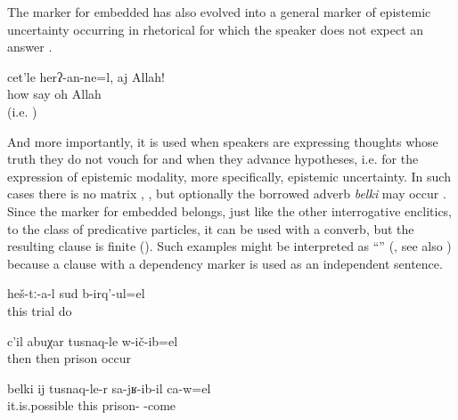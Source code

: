 The marker for embedded  has also evolved into a general marker of epistemic uncertainty occurring in rhetorical  for which the speaker does not expect an answer .

\begin{exe}
	\ex	\label{ex:How should this be said, oh, Allah!A}
	\gll	cet'le	herʔ-an-ne=l,	aj	Allah!\\
		how	say	oh	Allah\\
	\glt	{} (i.e. )
\end{exe}

And more importantly, it is used when speakers are expressing thoughts whose truth they do not vouch for and when they advance hypotheses, i.e. for the expression of epistemic modality, more specifically, epistemic uncertainty. In such cases there is no matrix  , , but optionally the borrowed adverb \textit{belki} may occur . Since the marker for embedded  belongs, just like the other interrogative enclitics, to the class of predicative particles, it can be used with a converb, but the resulting clause is finite (). Such examples might be interpreted as ``'' (\citealp{Evans2007, EvansWatanabe2016}, see also \citealp{Mithun2008}) because a clause with a dependency marker is used as an independent sentence. 

\begin{exe}
	\ex	\label{ex:They are making a trial or what}
	\gll	heš-tː-a-l	sud	b-irq'-ul=el\\
		this	trial	do\\
	\glt	{}

	\ex	\label{ex:Then he went to prison or so / or what}
	\gll	c'il	abuχar	tusnaq-le	w-ič-ib=el\\
		then	then	prison	occur\\
	\glt	{}

	\ex	\label{ex:‎Maybe this is when he came from prison}
	\gll	belki	ij	tusnaq-le-r	sa-jʁ-ib-il	ca-w=el\\
		it.is.possible	this	prison-	-come	\\
	\glt	{}
\end{exe}

